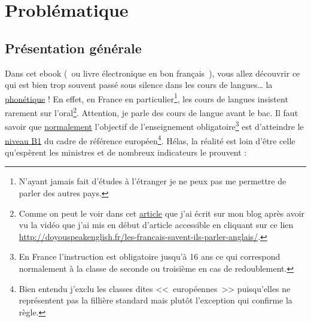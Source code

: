 \chapter{Problématique}\label{chap:intro}
\newpage
\minitoc
\newpage

\section{Présentation générale}\label{sec:pres}
Dans cet ebook (~ou livre électronique en bon français~), vous allez
découvrir ce qui est bien trop souvent passé sous silence dans les
cours de langues\ldots{} la \underline{phonétique} ! En effet, en France en
particulier\footnote{N'ayant jamais fait d'études à l'étranger je ne
  peux pas me permettre de parler des autres pays.}, les cours de
langues insistent rarement sur l'oral\footnote{Comme on peut le voir
  dans cet
  \href{http://doyouspeakenglish.fr/les-francais-savent-ils-parler-anglais/}{article}
  que j'ai écrit sur mon blog après avoir vu la vidéo que j'ai mis en
  début d'article accessible en cliquant sur ce lien 
  \url{http://doyouspeakenglish.fr/les-francais-savent-ils-parler-anglais/}.}. Attention, je parle des cours
de langue avant le bac. Il faut savoir que \underline{normalement}
l'objectif de l'enseignement obligatoire\footnote{En France
  l'instruction est obligatoire jusqu'à 16 ans ce qui correspond
  normalement à la classe de seconde ou troisième en cas de
  redoublement.} est d'atteindre le
\href{http://doyouspeakenglish.fr/quel-niveau-danglais-avez-vous/}{niveau
  B1} du cadre de référence européen\footnote{Bien entendu j'exclu les
classes dites <<~européennes~>> puisqu'elles ne représentent pas la
fillière standard mais plutôt l'exception qui confirme la règle.}. Hélas, la réalité est
loin d'être celle qu'espèrent les ministres et de nombreux indicateurs le prouvent :
